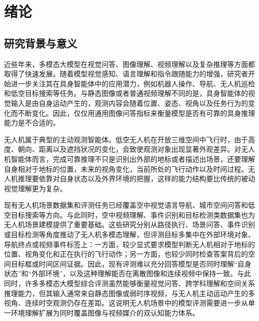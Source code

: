 
\chapter{绪论}

\section{研究背景与意义}

近些年来，多模态大模型在视觉问答、图像理解、视频理解以及复杂推理等方面都取得了快速发展。随着模型视觉感知、语言理解和指令跟随能力的增强，研究者开始进一步关注其在具身智能体中的应用潜力，例如机器人操作、导航、无人机巡检和低空目标搜索等任务\cite{shao2026uavwithllm,zeng2023robotics,li2025perception,han2025survey,lin2024embodied}。与静态图像或者普通视频理解不同的是，具身智能体的视觉输入是由自身运动产生的，观测内容会随着位置、姿态、视角以及任务行为的变化而不断变化。因此，仅仅用通用图像问答指标来衡量模型是否有可靠的具身推理能力是不合适的。

无人机属于典型的主动观测智能体。低空无人机在开放三维空间中飞行时，由于高度、朝向、距离以及遮挡状况的变化，会致使观测对象出现显著外观差异\cite{shao2025uavvln}。对无人机智能体而言，完成可靠推理不只是识别出外部的地标或者描述出场景，还要理解自身相对于地标的位置，未来的视角变化，当前所处的飞行动作以及时间过程。无人机推理要依靠对自身状态以及外界环境的把握，这样的能力结构要比传统的被动视觉理解更为复杂。

现有无人机场景数据集和评测任务已经覆盖空中视觉语言导航、城市空间问答和低空目标搜索等方向\cite{liu2023aerialvln,lee2025citynav,zhao2025cityeqa,ji2026towards}。与此同时，空中视频理解、事件识别和目标检测类数据集也为无人机场景建模提供了重要基础\cite{li2021uavhuman,zhao2025urbanvideobench,barekatain2017okutama,du2018unmanned}。这些研究分别从路径执行、场景问答、事件识别或目标检测等角度推动了无人机多模态理解，但评测目标多集中在外部环境对象、导航终点或视频事件标签上：一方面，较少显式要求模型判断无人机相对于地标的位置、视角变化和正在执行的飞行动作；另一方面，也较少同时检查答案背后的空间目标框或时间区间证据。因此，现有评测难以充分回答模型是否同时理解“自身状态”和“外部环境”，以及这种理解能否在离散图像和连续视频中保持一致。与此同时，许多多模态大模型综合评测虽然能够衡量视觉问答、跨学科理解和空间关系推理能力\cite{fu2023mme,liu2024mmbench,yu2023mmvet,yue2024mmmu,ge2025mllm}，但其输入通常来自静态图像或弱时序视频，与无人机主动运动产生的多视角、连续时空观测仍存在差距\cite{xu2026citycube}。这说明无人机场景中的模型评测需要进一步从单一环境理解扩展为同时覆盖图像与视频媒介的双认知能力体系。

